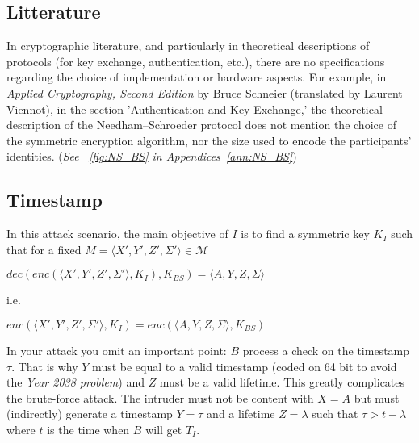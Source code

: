 \documentclass[11pt]{article}
\begin{document}
    \subsection{Litterature}

    In cryptographic literature, and particularly in theoretical descriptions of protocols (for key exchange,
    authentication, etc.), there are no specifications regarding the choice of implementation or hardware aspects. For
    example, in \textit{Applied Cryptography, Second Edition} by Bruce Schneier (translated by Laurent Viennot), in the
    section 'Authentication and Key Exchange,' the theoretical description of the Needham–Schroeder protocol does not
    mention the choice of the symmetric encryption algorithm, nor the size used to encode the participants’ identities.
    (\textit{See ~\ref{fig:NS_BS} in Appendices~\ref{ann:NS_BS}})



    \subsection{Timestamp}
    In this attack scenario, the main objective of $I$ is to find a symmetric key $K_I$ such that for a fixed
    $M = \langle X',Y',Z', \Sigma'\rangle \in \mathcal{M} $
    \begin{center}
        $dec(enc(\langle X',Y',Z', \Sigma'\rangle, K_I), K_{BS}) = \langle A,Y,Z, \Sigma \rangle $
    \end{center}
    i.e.

    \begin{center}
        $enc(\langle X',Y',Z', \Sigma'\rangle, K_I) = enc(\langle A,Y,Z, \Sigma \rangle, K_{BS}) $
    \end{center}

    In your attack you omit an important point: $B$ process a check on the timestamp $\tau$.  That is why $Y$ must be
    equal to a valid timestamp (coded on 64 bit to avoid the \textit{Year 2038 problem}) and $Z$ must be a valid lifetime.
    This greatly complicates the brute-force attack. The intruder must not be content with $X = A$ but must (indirectly)
    generate a timestamp $Y = \tau$ and a lifetime $Z = \lambda$ such that $\tau > t - \lambda$ where $t$ is the time
    when $B$ will get $T_I$.

    \vspace{0.5cm}
\end{document}
